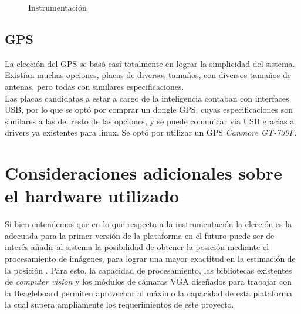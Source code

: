 \documentclass[main]{subfiles}
\begin{document}
\begin{figure} 
  \centering
  \hspace{2cm}
  
  \caption{Instrumentaci\'on}
  \label{fig:intrumentacion}
\end{figure}




\subsection{GPS}

La elecci\'on del GPS se bas\'o cas\'i totalmente en lograr la simplicidad del sistema. Exist\'ian muchas opciones, placas de diversos tama\~nos, con diversos tama\~nos de antenas, pero todas con similares especificaciones.\\

Las placas candidatas a estar a cargo de la inteligencia contaban con interfaces USB, por lo que se opt\'o por comprar un dongle GPS, cuyas especificaciones son similares a las del resto de las opciones, y se puede comunicar via USB gracias a drivers ya existentes para linux. Se opt\'o por utilizar un GPS \textit{Canmore GT-730F}.

\section{Consideraciones adicionales sobre el hardware utilizado}

Si bien entendemos que en lo que respecta a la instrumentaci\'on la elecci\'on es la adecuada para la primer versi\'on de la plataforma en el futuro puede ser de inter\'es añadir al sistema la posibilidad de obtener la posici\'on mediante el procesamiento de im\'agenes, para lograr una mayor exactitud en la estimaci\'on de la posici\'on . Para esto, la capacidad de procesamiento, las bibliotecas existentes de \emph{computer vision} y los m\'odulos de c\'amaras VGA dise\~nados para trabajar con la Beagleboard permiten aprovechar al m\'aximo la capacidad de esta plataforma la cual supera ampliamente los requerimientos de este proyecto.\\

 
\end{document}
